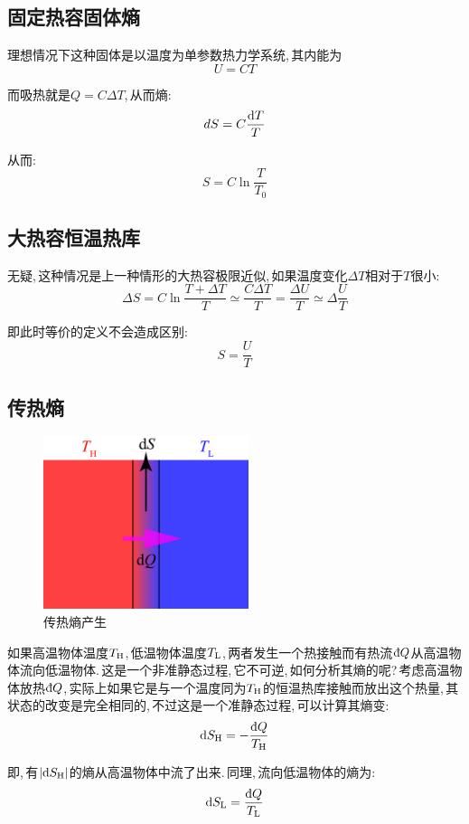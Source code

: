 \subsection{固定热容固体熵}

理想情况下这种固体是以温度为单参数热力学系统,\,其内能为
\[U=CT\]

而吸热就是$Q=C\Delta T$,\,从而熵:
\[dS=C\frac{\textrm{d} T}{T}\]

从而:
\[S=C\ln\frac{T}{T_0}\]

\subsection{大热容恒温热库}

无疑,\,这种情况是上一种情形的大热容极限近似,\,如果温度变化$\Delta T$相对于$T$很小:
\[\Delta S=C\ln\frac{T+\Delta T}{T}\simeq\frac{C\Delta T}{T}=\frac{\Delta U}{T}\simeq\Delta{\frac{U}{T}}\]

即此时等价的定义不会造成区别:
\[S=\frac{U}{T}\]

\subsection{传热熵}

\begin{figure}
\centering
\vspace{-0.5cm}
\includegraphics[width=6cm]{image/5-2-15.png}
\caption{传热熵产生}
\end{figure}
如果高温物体温度$T_{\rm H}$,\,低温物体温度$T_{\rm L}$,\,两者发生一个热接触而有热流$\dbar Q$从高温物体流向低温物体.\,这是一个非准静态过程,\,它不可逆,\,如何分析其熵的呢?\,考虑高温物体放热$\dbar Q$,\,实际上如果它是与一个温度同为$T_{\rm H}$的恒温热库接触而放出这个热量,\,其状态的改变是完全相同的,\,不过这是一个准静态过程,\,可以计算其熵变:
\[\ud S_{\rm H}=-\frac{\dbar Q}{T_{\rm H}}\]

即,\,有$|\textrm{d} S_{\rm H}|$的熵从高温物体中流了出来.\,同理,\,流向低温物体的熵为:
\[\ud S_{\rm L}=\frac{\dbar Q}{T_{\rm L}}\]

